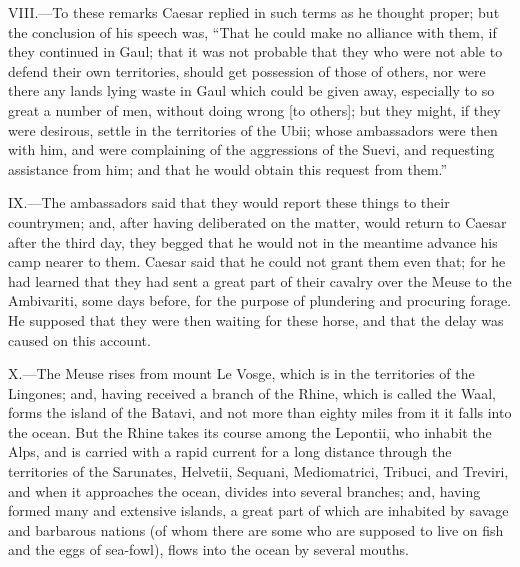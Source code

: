 VIII.—To these remarks Caesar replied in such terms as he thought
proper; but the conclusion of his speech was, ``That he could make no
alliance with them, if they continued in Gaul; that it was not probable
that they who were not able to defend their own territories, should get
possession of those of others, nor were there any lands lying waste in
Gaul which could be given away, especially to so great a number of men,
without doing wrong [to others]; but they might, if they were desirous,
settle in the territories of the Ubii; whose ambassadors were then with
him, and were complaining of the aggressions of the Suevi, and
requesting assistance from him; and that he would obtain this request
from them.''

IX.—The ambassadors said that they would report these things to their
countrymen; and, after having deliberated on the matter, would return to
Caesar after the third day, they begged that he would not in the
meantime advance his camp nearer to them. Caesar said that he could not
grant them even that; for he had learned that they had sent a great part
of their cavalry over the Meuse to the Ambivariti, some days before, for
the purpose of plundering and procuring forage. He supposed that they
were then waiting for these horse, and that the delay was caused on this
account.

X.—The Meuse rises from mount Le Vosge, which is in the territories of
the Lingones; and, having received a branch of the Rhine, which is
called the Waal, forms the island of the Batavi, and not more than
eighty miles from it it falls into the ocean. But the Rhine takes its
course among the Lepontii, who inhabit the Alps, and is carried with a
rapid current for a long distance through the territories of the
Sarunates, Helvetii, Sequani, Mediomatrici, Tribuci, and Treviri, and
when it approaches the ocean, divides into several branches; and, having
formed many and extensive islands, a great part of which are inhabited
by savage and barbarous nations (of whom there are some who are supposed
to live on fish and the eggs of sea-fowl), flows into the ocean by
several mouths.

